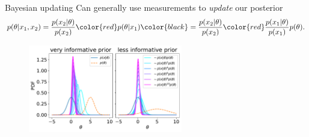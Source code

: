 \documentclass[
aspectratio=169,
14pt,
professionalfonts
]{beamer}
\begin{document}
\begin{frame}{Bayesian updating}
    \vspace{-0.5cm}
    Can generally use measurements to \textit{update} our posterior
    $$
    p(\theta | x_1, x_2) 
    = \frac{p(x_2|\theta)}{p(x_2)} \color{red} p(\theta | x_1) \color{black}
    = \frac{p(x_2|\theta)}{p(x_2)} \color{red} \frac{p(x_1|\theta)}{p(x_1)} p(\theta).
    $$
    \begin{figure}
        \centering
        \includegraphics[width=0.6\textwidth]{../plots/updating.pdf}
    \end{figure}


\end{frame}
\end{document}
